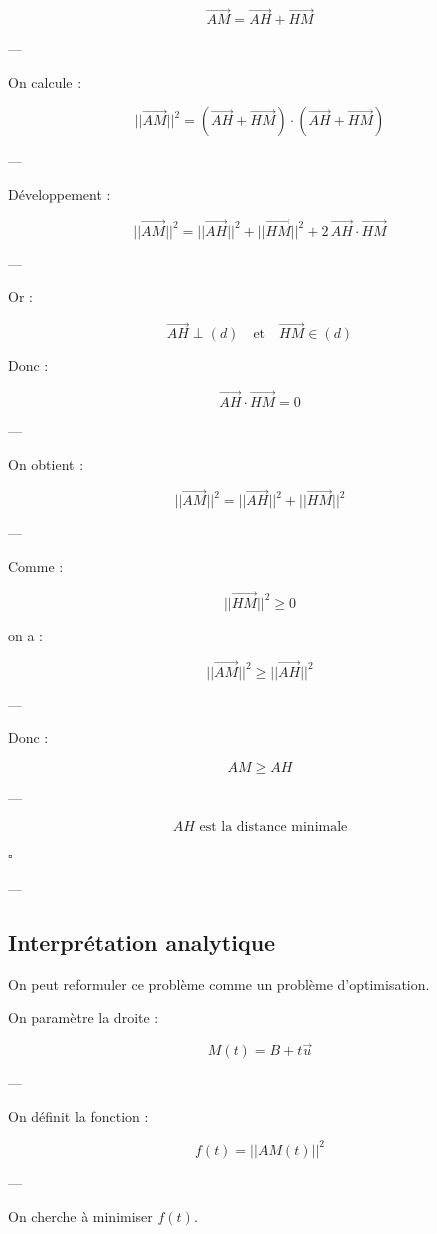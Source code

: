 \documentclass[11pt,a4paper]{article}
\begin{document}
\[
\vec{AM} = \vec{AH} + \vec{HM}
\]

---

On calcule :

\[
||\vec{AM}||^2 = (\vec{AH} + \vec{HM}) \cdot (\vec{AH} + \vec{HM})
\]

---

Développement :

\[
||\vec{AM}||^2 = ||\vec{AH}||^2 + ||\vec{HM}||^2 + 2\,\vec{AH} \cdot \vec{HM}
\]

---

Or :

\[
\vec{AH} \perp (d) \quad \text{et} \quad \vec{HM} \in (d)
\]

Donc :

\[
\vec{AH} \cdot \vec{HM} = 0
\]

---

On obtient :

\[
||\vec{AM}||^2 = ||\vec{AH}||^2 + ||\vec{HM}||^2
\]

---

Comme :

\[
||\vec{HM}||^2 \geq 0
\]

on a :

\[
||\vec{AM}||^2 \geq ||\vec{AH}||^2
\]

---

Donc :

\[
AM \geq AH
\]

---

\[
\boxed{
AH \text{ est la distance minimale}
}
\]

\hfill $\square$

---

\subsection{Interprétation analytique}

On peut reformuler ce problème comme un problème d’optimisation.

\bigskip

On paramètre la droite :

\[
M(t) = B + t\vec{u}
\]

---

On définit la fonction :

\[
f(t) = ||AM(t)||^2
\]

---

On cherche à minimiser $f(t)$.
\end{document}

